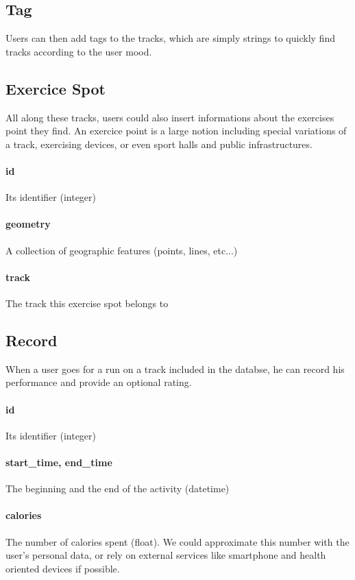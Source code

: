 \documentclass[a4paper]{article}
\begin{document}
\subsection{Tag}
Users can then add tags to the tracks, which are simply strings to quickly find
tracks according to the user mood.


\subsection{Exercice Spot}
All along these tracks, users could also insert informations about the exercises
point they find. An exercice point is a large notion including special variations
of a track, exercising devices, or even sport halls and public infrastructures.

\paragraph{id} Its identifier (integer)
\paragraph{geometry} A collection of geographic features (points, lines, etc...)
\paragraph{track} The track this exercise spot belongs to


\subsection{Record}
When a user goes for a run on a track included in the databse, he can record his
performance and provide an optional rating.

\paragraph{id} Its identifier (integer)
\paragraph{start\_time, end\_time} The beginning and the end of the activity (datetime)
\paragraph{calories} The number of calories spent  (float). We could approximate this number with the user's personal data, or rely on external services like smartphone and health oriented devices if possible.
\end{document}
